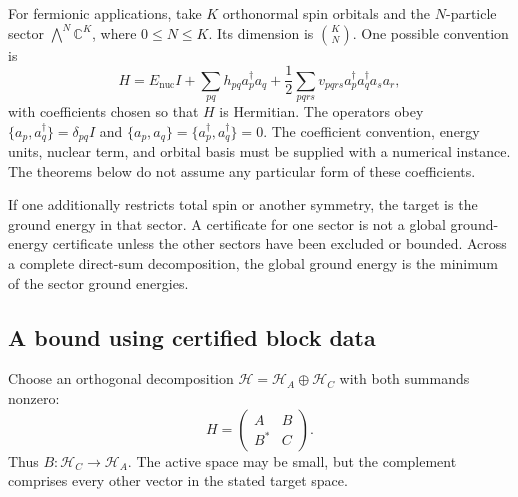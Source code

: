 \documentclass[11pt,a4paper]{article}
\theoremstyle{plain}
\theoremstyle{definition}
\theoremstyle{remark}
\newcommand{\C}{\mathbb{C}}
\begin{document}
For fermionic applications, take $K$ orthonormal spin orbitals and the
$N$-particle sector $\bigwedge^N\C^K$, where $0\le N\le K$.
Its dimension is $\binom K N$. One possible convention is
\begin{equation}
 H=E_{\mathrm{nuc}}I+\sum_{pq}h_{pq}a_p^\dagger a_q
   +\frac12\sum_{pqrs}v_{pqrs}a_p^\dagger a_q^\dagger a_s a_r,
 \label{eq:electronic}
\end{equation}
with coefficients chosen so that $H$ is Hermitian. The operators obey
$\{a_p,a_q^\dagger\}=\delta_{pq}I$ and
$\{a_p,a_q\}=\{a_p^\dagger,a_q^\dagger\}=0$.
The coefficient convention, energy units, nuclear term, and orbital basis
must be supplied with a numerical instance. The theorems below do not assume
any particular form of these coefficients.

If one additionally restricts total spin or another symmetry, the target is
the ground energy in that sector. A certificate for one sector is not a
global ground-energy certificate unless the other sectors have been excluded
or bounded. Across a complete direct-sum decomposition, the global ground
energy is the minimum of the sector ground energies.

\subsection{A bound using certified block data}
Choose an orthogonal decomposition
$\mathcal H=\mathcal H_A\oplus\mathcal H_C$ with both summands nonzero:
\begin{equation}
 H=\begin{pmatrix} A&B\\B^*&C\end{pmatrix}.
 \label{eq:block}
\end{equation}
Thus $B:\mathcal H_C\to\mathcal H_A$. The active space may be small,
but the complement comprises every other vector in the stated target space.
\end{document}
